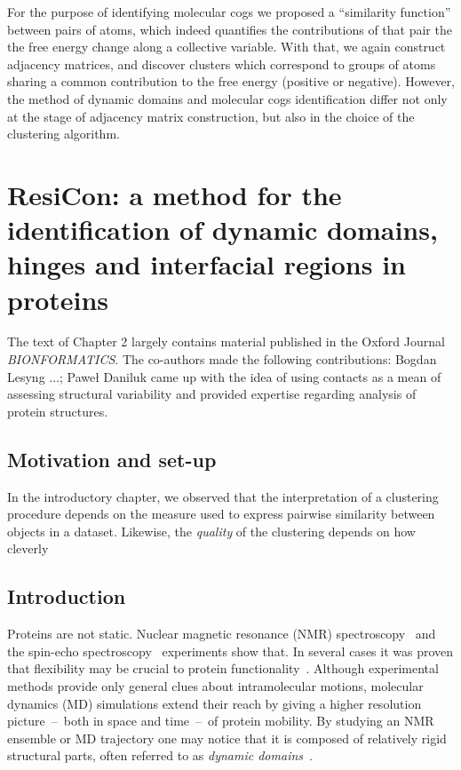 \documentclass[a4paper,11pt,twoside]{book}%
\begin{document}
For the purpose of identifying molecular cogs we proposed a ``similarity function'' between pairs of atoms, which indeed quantifies the contributions of that pair the the free energy change along a collective variable.
With that, we again construct adjacency matrices, and discover clusters which correspond to groups of atoms sharing a common contribution to the free energy (positive or negative).
However, the method of dynamic domains and molecular cogs identification differ not only at the stage of adjacency matrix construction, but also in the choice of the clustering algorithm.





\newcommand{\angstrom}{\mbox{\normalfont\AA}}
\newcommand{\myHeight}{0.13}
\renewcommand{\arraystretch}{1.9} %

\chapter{ResiCon: a method for the identification of dynamic domains, hinges and interfacial regions in proteins}

The text of Chapter 2 largely contains material published in the Oxford Journal \emph{BIONFORMATICS}.
The co-authors made the following contributions: Bogdan Lesyng ...; Pawe\l{} Daniluk came up with the idea of using contacts as a mean of assessing structural variability and provided expertise regarding analysis of protein structures.

\section{Motivation and set-up}

In the introductory chapter, we observed that the interpretation of a clustering procedure depends on the measure used to express pairwise similarity between objects in a dataset.
Likewise, the \emph{quality} of the clustering depends on how cleverly 

\section{Introduction}
Proteins are not static.
Nuclear magnetic resonance (NMR) spectroscopy~\cite{martin1988two} and the spin-echo spectroscopy~\cite{bu2011proteins} experiments show that.
In several cases it was proven that flexibility may be crucial to protein functionality~\cite{farago2010activation,hamelberg2005fast}.
Although experimental methods provide only general clues about intramolecular motions, molecular dynamics (MD) simulations extend their reach by giving a higher resolution picture~--~both in space and time~--~of protein mobility.
By studying an NMR ensemble or MD trajectory one may notice that it is composed of relatively rigid structural parts, often referred to as \emph{dynamic domains}~\cite{hayward1997model}.
\end{document}
